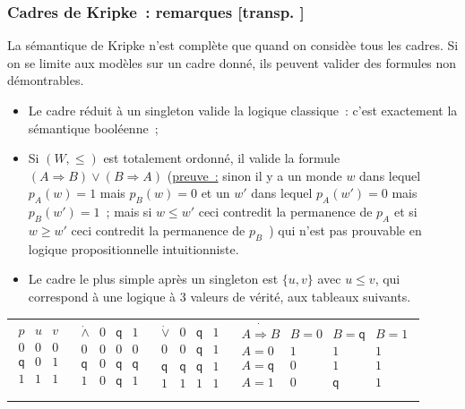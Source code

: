\documentclass[mathserif,a4paper,aspectratio=169]{beamer}
\newcommand{\dottedlimp}{\mathbin{\dot\Rightarrow}}
\newcommand{\dottedland}{\mathbin{\dot\land}}
\newcommand{\dottedlor}{\mathbin{\dot\lor}}
\renewcommand{\frametitle}[1]{\subsubsection*{#1 {\footnotesize[transp. \insertframenumber]}}}
\begin{document}
\begin{frame}
\frametitle{Cadres de Kripke : remarques}

La sémantique de Kripke n'est complète que quand on considèe
\alert{tous les cadres}.  Si on se limite aux modèles sur un cadre
donné, ils peuvent valider des formules non démontrables.
\begin{itemize}
\item Le cadre réduit à un singleton valide la logique classique :
  c'est exactement la sémantique booléenne ;
\item Si $(W,\leq)$ est totalement ordonné, il valide la formule
  $(A\Rightarrow B) \lor (B\Rightarrow A)$ {\footnotesize
  (\underline{preuve :} sinon il y a un monde $w$ dans lequel
  $p_A(w)=1$ mais $p_B(w)=0$ et un $w'$ dans lequel $p_A(w')=0$ mais
  $p_B(w')=1$ ; mais si $w\leq w'$ ceci contredit la permanence de
  $p_A$ et si $w\geq w'$ ceci contredit la permanence de
  $p_B$~\qedsymbol)} qui n'est pas prouvable en logique
  propositionnelle intuitionniste.
\item Le cadre le plus simple après un singleton est $\{u,v\}$ avec
  $u\leq v$, qui correspond à une logique à 3 valeurs de vérité, aux
  tableaux suivants.
\end{itemize}

{\footnotesize

\begin{tabular}{c|@{\hskip 15bp}c@{\hskip 15bp}c@{\hskip 15bp}c}
$
\begin{array}{c|cc}
p&u&v\\\hline
0&0&0\\
\mathsf{q}&0&1\\
1&1&1\\
\end{array}
$
&
$
\begin{array}{c|ccc}
\dottedland&0&\mathsf{q}&1\\\hline
0&0&0&0\\
\mathsf{q}&0&\mathsf{q}&\mathsf{q}\\
1&0&\mathsf{q}&1\\
\end{array}
$
&
$
\begin{array}{c|ccc}
\dottedlor&0&\mathsf{q}&1\\\hline
0&0&\mathsf{q}&1\\
\mathsf{q}&\mathsf{q}&\mathsf{q}&1\\
1&1&1&1\\
\end{array}
$
&
$
\begin{array}{c|ccc}
A \dottedlimp B&B=0&B={\mathsf{q}}&B=1\\\hline
A=0&1&1&1\\
A={\mathsf{q}}&0&1&1\\
A=1&0&\mathsf{q}&1\\
\end{array}
$
\end{tabular}

\par}

\end{frame}
\end{document}
